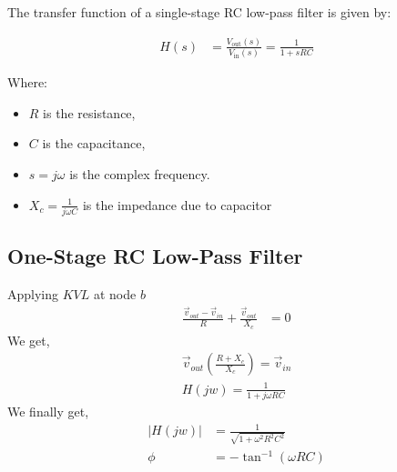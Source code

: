 \documentclass[a4paper,12pt]{article}
\begin{document}
The transfer function of a single-stage RC low-pass filter is given by:

\begin{align*}
H(s) &= \frac{V_{\text{out}}(s)}{V_{\text{in}}(s)} = \frac{1}{1 + sRC}
\end{align*}

Where:
\begin{itemize}
    \item $ R $ is the resistance,
    \item $ C $ is the capacitance,
    \item $ s = j\omega $ is the complex frequency.
    \item $X_c = \frac{1}{j\omega C}$ is the impedance due to capacitor
\end{itemize}

\subsection{One-Stage RC Low-Pass Filter}
\pagebreak
\begin{figure}[!h]
\centering
{}%
\label{one-cascade}
\end{figure}
Applying $KVL$ at node $b$
\begin{align*}
    \frac{\vec{v}_{out} - \vec{v}_{in}}{R} + \frac{\vec{v}_{out}}{X_c} &= 0
\end{align*}
We get, 
\begin{align*}
    \vec{v}_{out} \left( \frac{R+X_c}{X_c} \right) = \vec{v}_{in}\\
    H(jw) =  \frac{1}{1+j\omega RC}
\end{align*}
We finally get,
\begin{align*}
    |H(jw)| &= \frac{1}{\sqrt{1 + \omega^2 R^2 C^2}}\\
    \phi &= -\tan^{-1}\left( \omega RC\right)
\end{align*}
\end{document}
